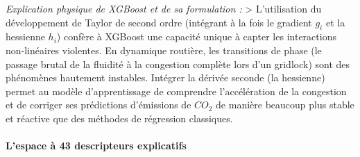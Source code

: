 \documentclass[10pt, a4paper]{article}
\begin{document}
\emph{Explication physique de XGBoost et de sa formulation :}
\textgreater{} L'utilisation du développement de Taylor de second ordre
(intégrant à la fois le gradient \(g_i\) et la hessienne \(h_i\))
confère à XGBoost une capacité unique à capter les interactions
non-linéaires violentes. En dynamique routière, les transitions de phase
(le passage brutal de la fluidité à la congestion complète lors d'un
gridlock) sont des phénomènes hautement instables. Intégrer la dérivée
seconde (la hessienne) permet au modèle d'apprentissage de comprendre
l'accélération de la congestion et de corriger ses prédictions
d'émissions de \(CO_2\) de manière beaucoup plus stable et réactive que
des méthodes de régression classiques.

\paragraph{L'espace à 43 descripteurs
explicatifs}\label{lespace-uxe0-43-descripteurs-explicatifs}
\end{document}
